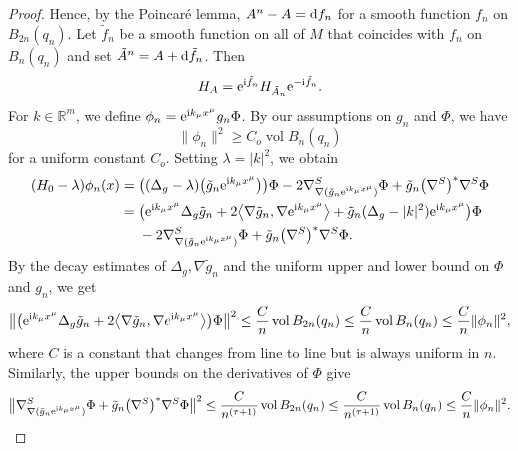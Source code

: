 \documentclass[pdftex]{sigma}
\numberwithin{equation}{section}
\begin{document}
\begin{proof}
Hence, by the Poincar\'e lemma, $A^n-A={\rm d}f_n$ for a smooth function $f_n$ on $B_{2n}(q_n)$. Let $\tilde{f}_n$ be a smooth function on all of $M$ that coincides with $f_n$ on $B_{n}(q_n)$ and set $\tilde{A}^n=A+{\rm d}\tilde{f}_n$. Then
\[ H_A= {\rm e}^{{\mathrm{i}}\tilde{f}_n} H_{\tilde{A}_n}{\rm e}^{-{\mathrm{i}}\tilde{f}_n}.\]
For $k\in {\mathbb R}^m$, we define $\phi_n= {\rm e}^{{\mathrm{i}}k_\mu x^\mu} {g}_n\Phi$. By our assumptions on $g_n$ and $\Phi$, we have
\begin{equation*}%
\| \phi_n\|^2 \geq C_o \operatorname{vol}  B_{n}(q_n)
\end{equation*}
for a uniform constant $C_o$. Setting $\lambda = |k|^2$, we obtain
\begin{align*} (H_0 -\lambda)\phi_n(x) ={} & \bigl((\Delta_g -\lambda) \bigl(\tilde{g}_n{\rm e}^{{\mathrm{i}}k_\mu x^\mu}\bigr)\bigr) \Phi - 2 \nabla^S_{\nabla (\tilde{g}_n {\rm e}^{{\mathrm{i}}k_\mu x^\mu} )} \Phi + \tilde{g}_n \bigl(\nabla^S\bigr)^*\nabla^S \Phi\\
	={} & \bigl({\rm e}^{{\mathrm{i}}k_\mu x^\mu}\Delta_g \tilde{g}_n + 2\bigl\langle \nabla \tilde{g}_n, \nabla {\rm e}^{{\mathrm{i}}k_\mu x^\mu}\bigr\rangle + \tilde{g}_n (\Delta_g - |k|^2) {\rm e}^{{\mathrm{i}}k_\mu x^\mu} \bigr) \Phi\\&
- 2 \nabla^S_{\nabla (\tilde{g}_n {\rm e}^{{\mathrm{i}}k_\mu x^\mu})} \Phi + \tilde{g}_n \bigl(\nabla^S\bigr)^*\nabla^S \Phi.\end{align*}
By the decay estimates of $\Delta_g, \nabla \tilde{g}_n$ and the uniform upper and lower bound on $\Phi$ and $g_n$, we get
\begin{align*}
\bigl\|\bigl({\rm e}^{{\mathrm{i}}k_\mu x^\mu}\Delta_g \tilde{g}_n + 2\bigl\langle \nabla \tilde{g}_n, \nabla e^{{\mathrm{i}}k_\mu x^\mu}\bigr\rangle \bigr) \Phi\bigr\|^2 \leq \frac{C}{n} \operatorname{vol}  B_{2n}(q_n)\leq \frac{C}{n} \operatorname{vol}  B_{n}(q_n) \leq \frac{C}{n} \| \phi_n\|^2,
\end{align*}
where $C$ is a constant that changes from line to line but is always uniform in $n$. Similarly, the upper bounds on the derivatives of $\Phi$ give
\begin{align*}
\bigl\| \nabla^S_{\nabla  (\tilde{g}_n {\rm e}^{{\mathrm{i}}k_\mu x^\mu} )} \Phi + \tilde{g}_n \bigl(\nabla^S\bigr)^*\nabla^S \Phi \bigr\|^2
\leq \frac{C}{n^{(\tau+1)}} \operatorname{vol}  B_{2n}(q_n)\leq \frac{C}{n^{(\tau+1)}} \operatorname{vol}  B_{n}(q_n) \leq \frac{C}{n} \| \phi_n\|^2.
\end{align*}	

\end{proof}
\end{document}
